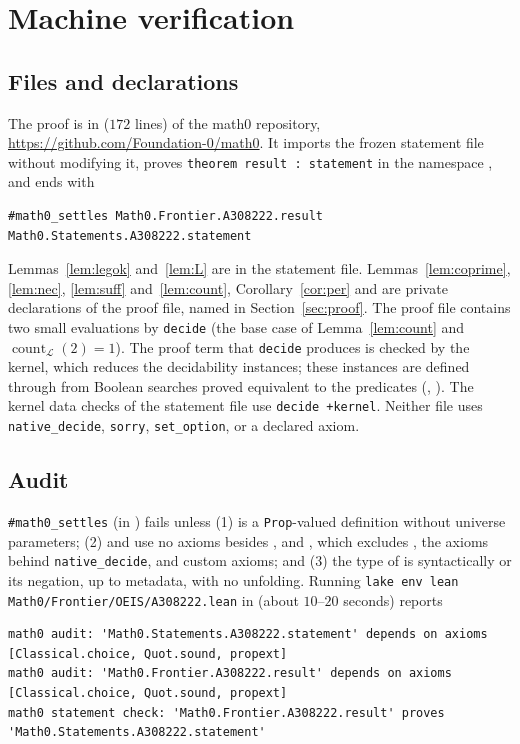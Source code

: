 \documentclass[11pt]{amsart}
\theoremstyle{plain}
\theoremstyle{definition}
\newcommand{\code}[1]{\texttt{#1}}
\newcommand{\Leg}{\mathcal{L}}
\DeclareMathOperator{\cnt}{count}
\begin{document}
\section{Machine verification}\label{sec:lean}

\subsection*{Files and declarations}
The proof is in  ($172$ lines) of the math0 repository, \url{https://github.com/Foundation-0/math0}. It imports the frozen statement file  without modifying it, proves \code{theorem result : statement} in the namespace , and ends with
\begin{lstlisting}
#math0_settles Math0.Frontier.A308222.result Math0.Statements.A308222.statement
\end{lstlisting}
Lemmas~\ref{lem:legok} and~\ref{lem:L} are in the statement file. Lemmas~\ref{lem:coprime}, \ref{lem:nec}, \ref{lem:suff} and~\ref{lem:count}, Corollary~\ref{cor:per} and  are private declarations of the proof file, named in Section~\ref{sec:proof}. The proof file contains two small evaluations by \code{decide} (the base case of Lemma~\ref{lem:count} and $\cnt_\Leg(2)=1$). The proof term that \code{decide} produces is checked by the kernel, which reduces the decidability instances; these instances are defined through  from Boolean searches proved equivalent to the predicates (, ). The kernel data checks of the statement file use \texttt{decide +kernel}. Neither file uses \texttt{native\_decide}, \texttt{sorry}, \texttt{set\_option}, or a declared axiom.

\subsection*{Audit}
\texttt{\#math0\_settles} (in ) fails unless (1)  is a \texttt{Prop}-valued definition without universe parameters; (2)  and  use no axioms besides ,  and , which excludes , the axioms behind \texttt{native\_decide}, and custom axioms; and (3) the type of  is syntactically  or its negation, up to metadata, with no unfolding. Running \texttt{lake env lean Math0/Frontier/OEIS/A308222.lean} in  (about $10$--$20$ seconds) reports
\begin{lstlisting}[basicstyle=\ttfamily\scriptsize]
math0 audit: 'Math0.Statements.A308222.statement' depends on axioms [Classical.choice, Quot.sound, propext]
math0 audit: 'Math0.Frontier.A308222.result' depends on axioms [Classical.choice, Quot.sound, propext]
math0 statement check: 'Math0.Frontier.A308222.result' proves 'Math0.Statements.A308222.statement'
\end{lstlisting}
\end{document}
